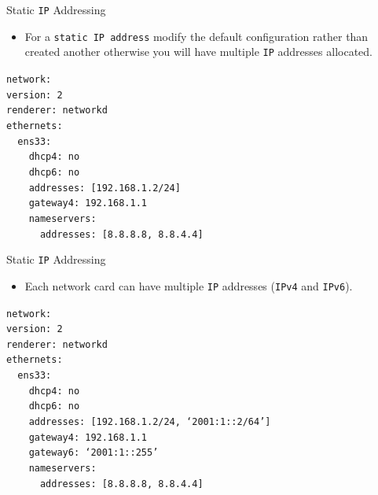 \documentclass{beamer}
\begin{document}
\begin{frame}{Static \texttt{IP} Addressing}
  \begin{itemize}
    \item For a \texttt{static IP address} modify the default configuration rather than created another otherwise you will have multiple \texttt{IP} addresses allocated.
  \end{itemize}
  \begin{center}
    \begin{minipage}{9cm}
      \begin{block}{}
        \texttt{network:\\
        version: 2\\
        renderer: networkd\\
        ethernets:\\
        ~~ens33:\\
        ~~~~dhcp4: no\\
        ~~~~dhcp6: no\\
        ~~~~addresses: [192.168.1.2/24]\\
        ~~~~gateway4: 192.168.1.1\\
        ~~~~nameservers:\\
        ~~~~~~addresses: [8.8.8.8, 8.8.4.4]}
      \end{block}
    \end{minipage}
  \end{center}
\end{frame}

\begin{frame}{Static \texttt{IP} Addressing}
  \begin{itemize}
    \item Each network card can have multiple \texttt{IP} addresses (\texttt{IPv4} and \texttt{IPv6}).
  \end{itemize}
  \begin{center}
    \begin{minipage}{9cm}
      \begin{block}{}
        \texttt{network:\\
        version: 2\\
        renderer: networkd\\
        ethernets:\\
        ~~ens33:\\
        ~~~~dhcp4: no\\
        ~~~~dhcp6: no\\
        ~~~~addresses: [192.168.1.2/24, `2001:1::2/64']\\
        ~~~~gateway4: 192.168.1.1\\
        ~~~~gateway6: `2001:1::255'\\
        ~~~~nameservers:\\
        ~~~~~~addresses: [8.8.8.8, 8.8.4.4]}
      \end{block}
    \end{minipage}
  \end{center}
\end{frame}
\end{document}
